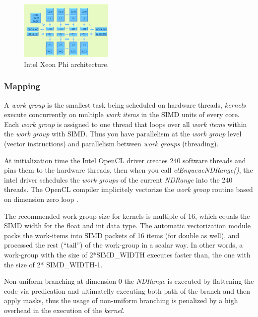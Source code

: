 \begin{figure}[!h]
    \centering
    \includegraphics[width=0.4\textwidth]{figures/phi_arch.png}
    \caption{Intel Xeon Phi architecture\cite{opencl_phi}.}
    \label{PhiArch}
\end{figure}

\subsubsection{Mapping}

\par{A \emph{work group} is the smallest task being scheduled on hardware threads, \emph{kernels} execute concurrently on multiple 
    \emph{work items} in the SIMD units of every core. Each \emph{work group} is assigned to one thread that loops over all 
    \emph{work items} within the \emph{work group} with SIMD. Thus you have parallelism at the \emph{work group} level 
    (vector instructions) and parallelism between \emph{work groups} (threading)\cite{opencl_phi,opencl_phi_opt}.}

\par{At initialization time the Intel OpenCL driver creates 240 software threads and pins them to the hardware threads, then
    when you call \emph{clEnqueueNDRange()}, the intel driver schedules the \emph{work groups} of the current \emph{NDRange}
    into the 240 threads. The OpenCL compiler implicitely vectorize the \emph{work group} routine based on dimension zero loop
    \cite{opencl_phi}.}

\par{The recommended work-group size for kernels is multiple of 16, which equals the SIMD width for the float and int data 
    type. The automatic vectorization module packs the work-items into SIMD packets of 16 items (for double as well), and 
    processed the rest (“tail”) of the work-group in a scalar way. In other words, a work-group with the size of 2*SIMD\_WIDTH 
    executes faster than, the one with the size of 2* SIMD\_WIDTH-1\cite{opencl_phi_opt,opencl_phi}.}

\par{Non-uniform branching at dimension 0 the \emph{NDRange} is executed by flattening the code via predication and 
    ultimatelly executing both path of the branch and then apply masks, thus the usage of non-uniform branching is penalized by 
    a high overhead in the execution of the \emph{kernel}\cite{opencl_phi}.}
    
